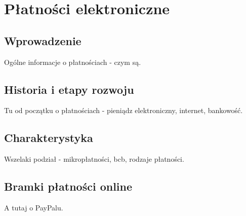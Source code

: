 \section{Płatności elektroniczne}

\subsection{Wprowadzenie}

Ogólne informacje o płatnościach - czym są.

\subsection{Historia i etapy rozwoju}

Tu od początku o płatnościach - pieniądz elektroniczny, internet, bankowość.

\subsection{Charakterystyka}

Wszelaki podział - mikropłatności, bcb, rodzaje płatności.

\subsection{Bramki płatności online}

A tutaj o PayPalu.
